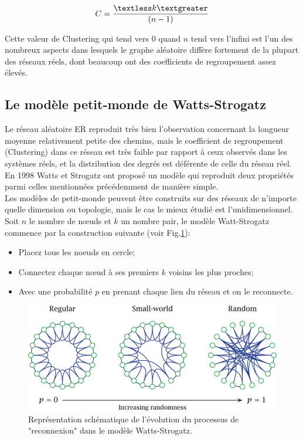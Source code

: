  \begin{equation}
 C=\dfrac{\textless k\textgreater}{(n - 1)}
 \end{equation}
 
Cette valeur de Clustering qui tend vers $0$ quand $n$ tend vers l'infini est l'un des nombreux aspects dans lesquels le graphe aléatoire diffère fortement de la plupart des réseaux réels, dont beaucoup ont des coefficients de regroupement assez élevés.
 
 
 \subsection{Le modèle petit-monde de Watts-Strogatz}
 

   Le réseau aléatoire ER reproduit très bien l'observation concernant la longueur moyenne relativement petite des chemins, mais le coefficient de regroupement (Clustering) dans ce réseau est très faible par rapport à ceux observés dans les systèmes réels, et la distribution des degrés est déférente de celle du réseau réel. En 1998 Watts et Strogatz \cite{Watss-Strogatz1998} ont proposé un modèle qui reproduit deux propriétés parmi celles mentionnées précédemment de manière simple.\\
   Les modèles de petit-monde peuvent être construits sur des réseaux de n'importe quelle dimension ou topologie, mais le cas le mieux étudié est l'unidimensionnel. Soit $n$ le nombre de nœuds et $k$ un nombre pair, le modèle Watt-Strogatz commence par la construction suivante (voir Fig.\ref{SW1}): 
   \begin{itemize}
   	\item Placez tous les noeuds en cercle;
   	\item Connectez chaque nœud à ses premiers $k$ voisins les plus proches;
   	\item  Avec une probabilité $p$ en prenant chaque lien du réseau et on le reconnecte.
   \end{itemize}
   \begin{figure}[h!]
   	\centering
   	\includegraphics[scale=0.6]{./figures/SW1}
   	\caption{Représentation schématique de l'évolution du processus de "reconnexion" dans le modèle Watts-Strogatz.}  	
   	\label{SW1}
   \end{figure}

